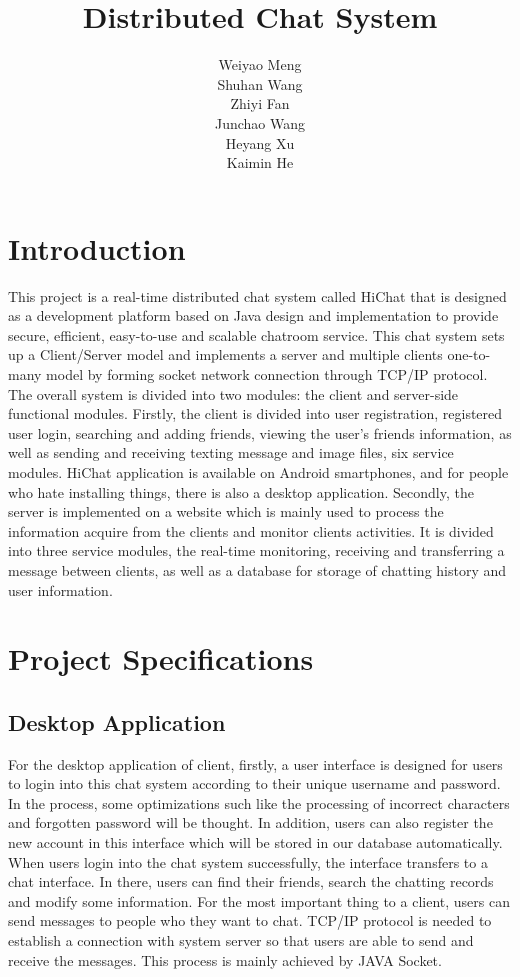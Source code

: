 \documentclass{article}
\title{Distributed Chat System}
\author{
Weiyao Meng\\
\And
Shuhan Wang\\
\And
Zhiyi Fan\\
\And
Junchao Wang\\
\And
Heyang Xu\\
\And
Kaimin He\\
}
\begin{document}
\maketitle

\section{Introduction}
This project is a real-time distributed chat system called HiChat that is designed as a development platform based on Java design and implementation to provide secure, efficient, easy-to-use and scalable chatroom service. This chat system sets up a Client/Server model and implements a server and multiple clients one-to-many model by forming socket network connection through TCP/IP protocol.
\\


The overall system is divided into two modules: the client and server-side functional modules. Firstly, the client is divided into user registration, registered user login, searching and adding friends, viewing the user's friends information, as well as sending and receiving texting message and image files, six service modules. HiChat application is available on Android smartphones, and for people who hate installing things, there is also a desktop application. Secondly, the server is implemented on a website which is mainly used to process the information acquire from the clients and monitor clients activities. It is divided into three service modules, the real-time monitoring, receiving and transferring a message between clients, as well as a database for storage of chatting history and user information.
\\


\section{Project Specifications}

\subsection{Desktop Application}
For the desktop application of client, firstly, a user interface is designed for users to login into this chat system according to their unique username and password. In the process, some optimizations such like the processing of incorrect characters and forgotten password will be thought. In addition, users can also register the new account in this interface which will be stored in our database automatically. When users login into the chat system successfully, the interface transfers to a chat interface. In there, users can find their friends, search the chatting records and modify some information. For the most important thing to a client, users can send messages to people who they want to chat. TCP/IP protocol is needed to establish a connection with system server so that users are able to send and receive the messages. \cite{bib2}This process is mainly achieved by JAVA Socket.\\
\end{document}

